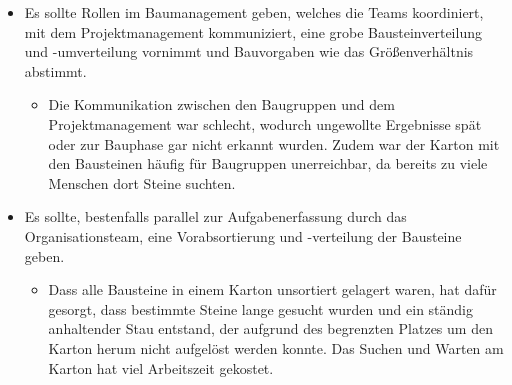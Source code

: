 \documentclass[a4paper, 11pt]{article}
\begin{document}
\begin{itemize}
    \item Es sollte Rollen im Baumanagement geben, welches die Teams koordiniert, mit dem Projektmanagement kommuniziert, eine grobe Bausteinverteilung und -umverteilung vornimmt und Bauvorgaben wie das Größenverhältnis abstimmt.
    \begin{itemize}
        \item[\ding{227}] Die Kommunikation zwischen den Baugruppen und dem Projektmanagement war schlecht, wodurch ungewollte Ergebnisse spät oder zur Bauphase gar nicht erkannt wurden. Zudem war der Karton mit den Bausteinen häufig für Baugruppen unerreichbar, da bereits zu viele Menschen dort Steine suchten.
    \end{itemize}
    \item Es sollte, bestenfalls parallel zur Aufgabenerfassung durch das Organisationsteam, eine Vorabsortierung und -verteilung der Bausteine geben.
    \begin{itemize}
        \item[\ding{227}] Dass alle Bausteine in einem Karton unsortiert gelagert waren, hat dafür gesorgt, dass bestimmte Steine lange gesucht wurden und ein ständig anhaltender Stau entstand, der aufgrund des begrenzten Platzes um den Karton herum nicht aufgelöst werden konnte. Das Suchen und Warten am Karton hat viel Arbeitszeit gekostet.
    \end{itemize}
\end{itemize}

\end{document}
